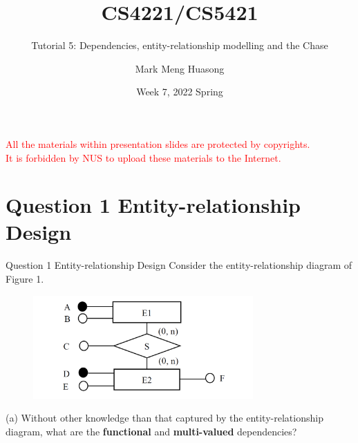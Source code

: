 \title{CS4221/CS5421}

\subtitle{Tutorial 5: Dependencies, entity-relationship modelling and the Chase}

\author{Mark Meng Huasong}



\date{Week 7, 2022 Spring}

\begin{frame}
	\titlepage
	\begin{tcolorbox}
		\begin{center}
			{\scriptsize \textcolor{red}{All the materials within presentation slides are protected by copyrights.\\
					It is forbidden by NUS to upload these materials to the Internet.}}
		\end{center}
	\end{tcolorbox}
\end{frame}

\section*{Question 1 Entity-relationship Design}

\begin{frame}[fragile]{Question 1 Entity-relationship Design}
Consider the entity-relationship diagram of Figure 1.
\begin{figure}
	\includegraphics[width=0.75\textwidth, trim=0 0 0 0, clip]{4221-t5/images/q1.png}
\end{figure}
(a) Without other knowledge than that captured by the entity-relationship diagram, what are the \textbf{functional} and \textbf{multi-valued} dependencies?
\end{frame}


